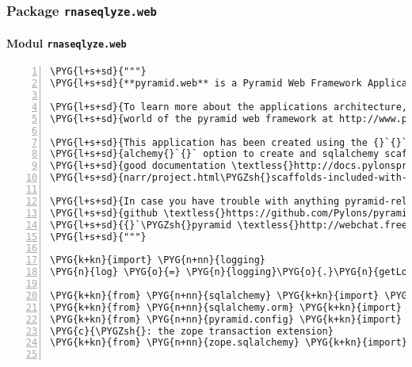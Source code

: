 \subsubsection{Package \texttt{rnaseqlyze.web}}
\label{rnaseqlyze-pdf:package-rnaseqlyze-web}

\paragraph{Modul \texttt{rnaseqlyze.web}}
\label{rnaseqlyze-pdf:modul-rnaseqlyze-web}
\begin{Verbatim}[commandchars=\\\{\},numbers=left,firstnumber=1,stepnumber=5]
\PYG{l+s+sd}{"""}
\PYG{l+s+sd}{**pyramid.web** is a Pyramid Web Framework Application.}

\PYG{l+s+sd}{To learn more about the applications architecture, head over to the wonderful}
\PYG{l+s+sd}{world of the pyramid web framework at http://www.pylonsproject.org/.}

\PYG{l+s+sd}{This application has been created using the {}`{}`pcreate{}`{}` command with the {}`{}`-s}
\PYG{l+s+sd}{alchemy{}`{}` option to create and sqlalchemy scaffold. There is plenty of {}`very}
\PYG{l+s+sd}{good documentation \textless{}http://docs.pylonsproject.org/projects/pyramid/en/latest/\PYGZbs{}}
\PYG{l+s+sd}{narr/project.html\PYGZsh{}scaffolds-included-with-pyramid\textgreater{}{}`\PYGZus{} available on how to do it.}

\PYG{l+s+sd}{In case you have trouble with anything pyramid-related, use the {}`source code on}
\PYG{l+s+sd}{github \textless{}https://github.com/Pylons/pyramid\textgreater{}{}`\PYGZus{} or ask 'mcdonc' on freenode irc}
\PYG{l+s+sd}{{}`\PYGZsh{}pyramid \textless{}http://webchat.freenode.net/?channels=\PYGZsh{}pyramid\textgreater{}{}`\PYGZus{}.}
\PYG{l+s+sd}{"""}

\PYG{k+kn}{import} \PYG{n+nn}{logging}
\PYG{n}{log} \PYG{o}{=} \PYG{n}{logging}\PYG{o}{.}\PYG{n}{getLogger}\PYG{p}{(}\PYG{n}{\PYGZus{}\PYGZus{}name\PYGZus{}\PYGZus{}}\PYG{p}{)}

\PYG{k+kn}{from} \PYG{n+nn}{sqlalchemy} \PYG{k+kn}{import} \PYG{n}{create\PYGZus{}engine}
\PYG{k+kn}{from} \PYG{n+nn}{sqlalchemy.orm} \PYG{k+kn}{import} \PYG{n}{sessionmaker}\PYG{p}{,} \PYG{n}{scoped\PYGZus{}session}
\PYG{k+kn}{from} \PYG{n+nn}{pyramid.config} \PYG{k+kn}{import} \PYG{n}{Configurator}
\PYG{c}{\PYGZsh{}: the zope transaction extension}
\PYG{k+kn}{from} \PYG{n+nn}{zope.sqlalchemy} \PYG{k+kn}{import} \PYG{n}{ZopeTransactionExtension}


\end{Verbatim}

